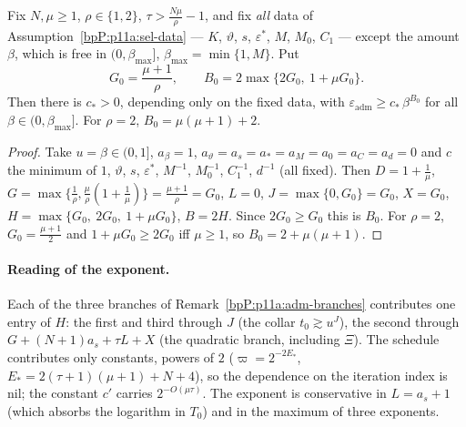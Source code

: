 \begin{corollary}\label{bpP:p11a:adm-budget-beta}
Fix $N,\mu\ge1$, $\rho\in\{1,2\}$, $\tau>\frac{N\mu}\rho-1$, and fix \emph{all} data of Assumption~\ref{bpP:p11a:sel-data} --- $K$, $\vartheta$, $s$, $\varepsilon^*$, $M$, $M_0$, $C_1$ --- except the amount $\beta$, which is free in $(0,\beta_{\max}]$, $\beta_{\max}=\min\{1,M\}$. Put
\[G_0=\frac{\mu+1}\rho,\qquad B_0=2\max\{2G_0,\ 1+\mu G_0\}.\]
Then there is $c_*>0$, depending only on the fixed data, with $\varepsilon_{\mathrm{adm}}\ge c_*\,\beta^{B_0}$ for all $\beta\in(0,\beta_{\max}]$. For $\rho=2$, $B_0=\mu(\mu+1)+2$.
\end{corollary}
\begin{proof}
\label{stepP:p11a:abb-spec} Take $u=\beta\in(0,1]$, $a_\beta=1$, $a_\vartheta=a_s=a_*=a_M=a_0=a_C=a_d=0$ and $c$ the minimum of $1$, $\vartheta$, $s$, $\varepsilon^*$, $M^{-1}$, $M_0^{-1}$, $C_1^{-1}$, $d^{-1}$ (all fixed). Then $D=1+\frac1\mu$, $G=\max\{\frac1\rho,\frac\mu\rho(1+\frac1\mu)\}=\frac{\mu+1}\rho=G_0$, $L=0$, $J=\max\{0,G_0\}=G_0$, $X=G_0$, $H=\max\{G_0,\ 2G_0,\ 1+\mu G_0\}$, $B=2H$. Since $2G_0\ge G_0$ this is $B_0$. For $\rho=2$, $G_0=\frac{\mu+1}2$ and $1+\mu G_0\ge2G_0$ iff $\mu\ge1$, so $B_0=2+\mu(\mu+1)$.
\end{proof}

\paragraph{Reading of the exponent.} Each of the three branches of Remark~\ref{bpP:p11a:adm-branches} contributes one entry of $H$: the first and third through $J$ (the collar $t_0\gtrsim u^{J}$), the second through $G+(N+1)a_s+\tau L+X$ (the quadratic branch, including $\Xi$). The schedule contributes only constants, powers of $2$ ($\varpi=2^{-2E_*}$, $E_*=2(\tau+1)(\mu+1)+N+4$), so the dependence on the iteration index is nil; the constant $c'$ carries $2^{-O(\mu\tau)}$. The exponent is conservative in $L=a_s+1$ (which absorbs the logarithm in $T_0$) and in the maximum of three exponents.

